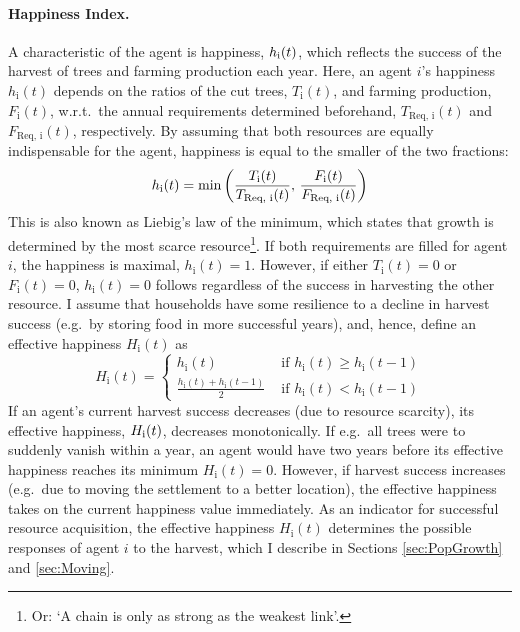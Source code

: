 \paragraph{Happiness Index.}
A characteristic of the agent is happiness, $h_{\rm i}(t)$, which reflects the success of the harvest of trees and farming production each year.
Here, an agent $i$'s happiness $h_\text{i}(t)$ depends on the ratios of the cut trees, $T_\text{i}(t)$, and farming production, $F_\text{i}(t)$, w.r.t.\ the annual requirements determined beforehand, $T_\text{Req, i}(t)$ and $F_\text{Req, i}(t)$, respectively.
By assuming that both resources are equally indispensable for the agent, happiness is equal to the smaller of the two fractions:
\begin{equation} 
h_\text{i}(t) = {\rm min} \left( \frac{T_\text{i}(t)}{T_\text{Req, i}(t)}, \, \frac{F_\text{i}(t)}{F_\text{Req, i}(t)} \right)
\label{eq:h_i}
\end{equation}
This is also known as Liebig's law of the minimum, which states that growth is determined by the most scarce resource\footnote{Or: `A chain is only as strong as the weakest link'.}.
If both requirements are filled for agent $i$, the happiness is maximal,  $h_\text{i}(t)=1$.
However, if either $T_\text{i}(t)=0$ or $F_\text{i}(t)=0$, $h_\text{i}(t)=0$ follows regardless of the success in harvesting the other resource.
I assume that households have some resilience to a decline in harvest success (e.g.\ by storing food in more successful years), and, hence, define an effective happiness $H_\text{i}(t)$ as
\begin{equation}
H_\text{i}(t) = \begin{cases} 
				h_\text{i}(t) & \text{ if } h_\text{i}(t)\geq h_\text{i}(t-1) \\
				\frac{h_\text{i}(t) + h_\text{i}(t-1)}{2} & \text{ if } h_\text{i}(t)<h_\text{i}(t-1) 
		\end{cases}
\end{equation}
If an agent's current harvest success decreases (due to resource scarcity), its effective happiness, $H_{\rm i}(t)$, decreases monotonically.
If e.g.\ all trees were to suddenly vanish within a year, an agent would have two years before its effective happiness reaches its minimum $H_\text{i}(t) = 0$.
However, if harvest success increases (e.g.\ due to moving the settlement to a better location), the effective happiness takes on the current happiness value immediately.
As an indicator for successful resource acquisition, the effective happiness $H_\text{i}(t)$ determines the possible responses of agent $i$ to the harvest, which I describe in Sections \ref{sec:PopGrowth} and \ref{sec:Moving}.

